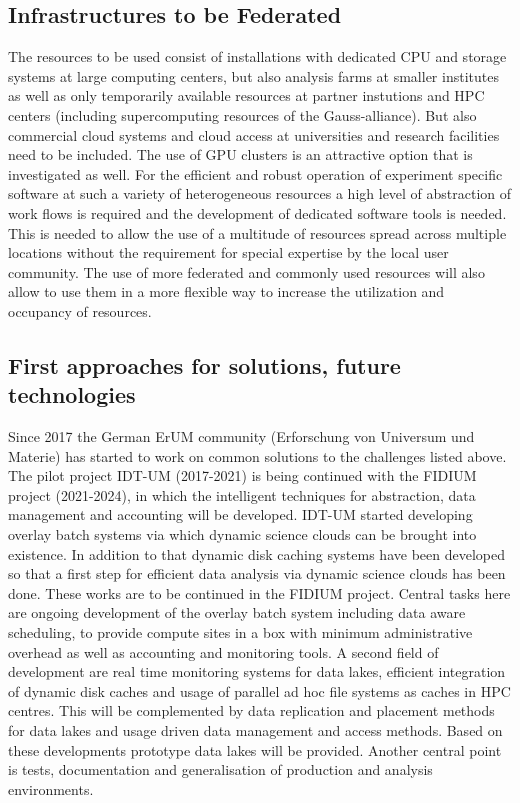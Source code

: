 \subsection{Infrastructures to be Federated \label{lab:ketfed} }
The resources to be used consist of installations with dedicated CPU
and storage systems at large computing centers, but also analysis
farms at smaller institutes as well as only temporarily available
resources at partner instutions and HPC centers (including
supercomputing resources of the Gauss-alliance). But also commercial
cloud systems and cloud access at universities and research facilities
need to be included. The use of GPU clusters is an attractive option
that is investigated as well. For the efficient and robust operation
of experiment specific software at such a variety of heterogeneous
resources a high level of abstraction of work flows is required and
the development of dedicated software tools is needed. This is needed
to allow the use of a multitude of resources spread across multiple
locations without the requirement for special expertise by the local user
community. The use of more federated and commonly used resources will
also allow to use them in a more flexible way to increase the
utilization and occupancy of resources.

\subsection{First approaches for solutions, future technologies}
Since 2017 the German ErUM community (Erforschung von Universum
und
Materie) has started to work on common solutions to the challenges
listed above. The pilot project IDT-UM (2017-2021) is being continued
with the FIDIUM project (2021-2024), in which the intelligent
techniques for abstraction, data management and accounting will be
developed. IDT-UM started developing overlay batch systems via which dynamic science clouds
can be brought into existence. In addition to that dynamic disk caching systems have been
developed so that a first step for efficient data analysis via dynamic science clouds has been done.
These works are to be continued in the FIDIUM project. Central tasks here are
ongoing development of the overlay batch system including data aware scheduling, to provide 
compute sites in a box with minimum administrative overhead as well as accounting and monitoring tools.
A second field of development are real time monitoring systems for data lakes,
efficient integration of dynamic disk caches and usage of parallel ad hoc file systems as caches in HPC centres.
This will be complemented by data replication and placement methods for data lakes and usage
driven data management and access methods. Based on these developments prototype data lakes will be provided.
Another central point is tests, documentation and generalisation of production and analysis environments.


